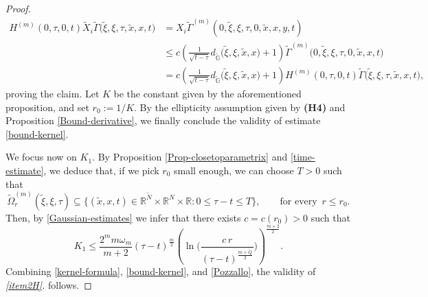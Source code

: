 \documentclass[10pt,a4paper]{amsart}
\def \G {{\Gamma}}
\def \GG {{\mathbb{G}}}
\newcommand{\R}{\mathbb{R}}
\def \rn {{\mathbb {R}}^{N}}
\def \rnm {{\mathbb {R}}^{\tilde N}}
\def \t {{\tau}}
\def \ti {\times}
\def \tt {\tilde}
\def \x {{\xi}}
\begin{document}
\begin{proof}
\begin{equation}
\begin{aligned}
			H^{(m)}(0,\t,0,t)\tt X_i\tt\G\big(\tt \x, \x, \t,\tt x, x,t\big)& = X_i\tt\G^{(m)}(0,\tt \x, \x, \t,0,\tt x, x,y,t)\\
			&\leq  c \left(\frac{1}{\sqrt{t-\t}}d_{\tt\GG}\big(\tt \x,  \x,\tt x,x \big) + 1 \right) \tt \G^{(m)}\big(0,\tt \x,\x ,\t,0,\tt x, x ,t\big)\\
			&= c \left(\frac{1}{\sqrt{t-\t}}d_{\tt\GG}\big(\tt \x,  \x,\tt x, x\big) + 1 \right) H^{(m)}(0,\t,0,t)\tt\G\big(\tt \x, \x, \t,\tt x, x,t\big),				
		\end{aligned}
	\end{equation}
	proving the claim. Let $K$ be the constant given by the aforementioned proposition, and set $r_0:=1/K$. By the ellipticity assumption given by \textbf{(H4)} and Proposition \ref{Bound-derivative}, we finally conclude the validity of estimate \eqref{bound-kernel}.
	
	
	We focus now on $K_1$. By Proposition \ref{Prop-closetoparametrix} and \eqref{time-estimate}, we deduce that, if we pick $r_0$ small enough, we can choose $T>0$ such that
	\begin{equation}
		\tt\Omega_{r}^{(m)}(\tt\x,\x,\t)\subseteq \Big\{(\tt x, x, t)\in \rnm\ti\rn\ti\R : 0\leq \t-t\leq T\Big\}, \qquad \text{for every }\,r\leq r_0.
	\end{equation}
	Then, by \eqref{Gaussian-estimates} we infer that there exists $c=c(r_0)>0$ such that
	\begin{equation}\label{Pozzallo}
		K_1\leq \frac{2^m m \omega_m}{m+2}(\t-t)^\frac{m}{2}\left(\ln\Bigg(\frac{c\,r}{(\t-t)^\frac{m+\tt Q}{2}}\Bigg) \right)^\frac{m+2}{2}.
	\end{equation}
	Combining \eqref{kernel-formula}, \eqref{bound-kernel}, and \eqref{Pozzallo}, the validity of \emph{\ref{item2H}.} follows.
	

\end{proof}
\end{document}
